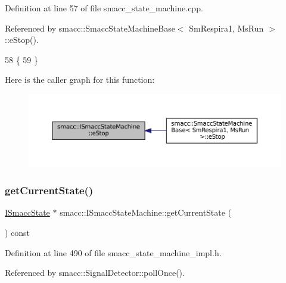 Definition at line 57 of file smacc\+\_\+state\+\_\+machine.\+cpp.



Referenced by smacc\+::\+Smacc\+State\+Machine\+Base$<$ Sm\+Respira1, Ms\+Run $>$\+::e\+Stop().


\begin{DoxyCode}
58 \{
59 \}
\end{DoxyCode}
Here is the caller graph for this function\+:
\nopagebreak
\begin{figure}[H]
\begin{center}
\leavevmode
\includegraphics[width=350pt]{classsmacc_1_1ISmaccStateMachine_a66a2900be8629748dab7a5c5ab6ae94e_icgraph}
\end{center}
\end{figure}
\mbox{\label{classsmacc_1_1ISmaccStateMachine_a610d09dc5341fb63732be713c21fbe86}} 
\subsubsection{\texorpdfstring{get\+Current\+State()}{getCurrentState()}}
{\footnotesize\ttfamily \hyperlink{classsmacc_1_1ISmaccState}{I\+Smacc\+State} $\ast$ smacc\+::\+I\+Smacc\+State\+Machine\+::get\+Current\+State (\begin{DoxyParamCaption}{ }\end{DoxyParamCaption}) const\hspace{0.3cm}{\ttfamily [inline]}}



Definition at line 490 of file smacc\+\_\+state\+\_\+machine\+\_\+impl.\+h.



Referenced by smacc\+::\+Signal\+Detector\+::poll\+Once().


